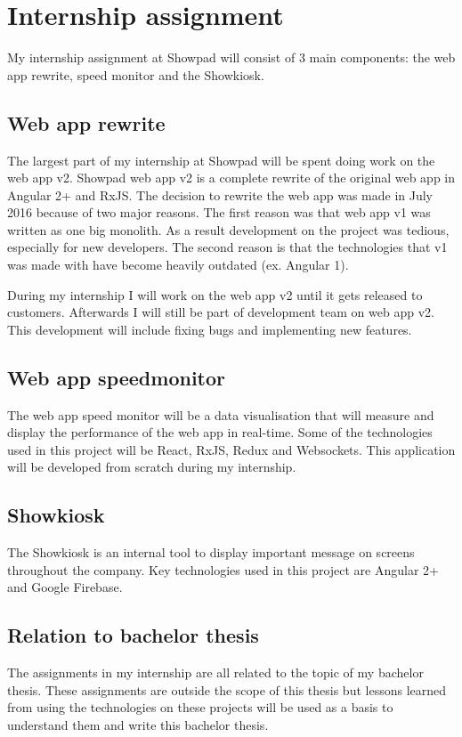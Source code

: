 \chapter{Internship assignment} %
\label{sec:opdracht}

My internship assignment at Showpad will consist of 3 main components: the web app rewrite, speed monitor and the Showkiosk.

\section{Web app rewrite}

The largest part of my internship at Showpad will be spent doing work on the web app v2. Showpad web app v2 is a complete rewrite of the original web app in Angular 2+ and RxJS. The decision to rewrite the web app was made in July 2016 because of two major reasons. The first reason was that web app v1 was written as one big monolith. As a result development on the project was tedious, especially for new developers. The second reason is that the technologies that v1 was made with have become heavily outdated (ex. Angular 1).

During my internship I will work on the web app v2 until it gets released to customers. Afterwards I will still be part of development team on web app v2. This development will include fixing bugs and implementing new features.

\section{Web app speedmonitor}

The web app speed monitor will be a data visualisation that will measure and display the performance of the web app in real-time. Some of the technologies used in this project will be React, RxJS, Redux and Websockets. This application will be developed from scratch during my internship.

\section{Showkiosk}

The Showkiosk is an internal tool to display important message on screens throughout the company. Key technologies used in this project are Angular 2+ and Google Firebase.

\section{Relation to bachelor thesis}

The assignments in my internship are all related to the topic of my bachelor thesis. These assignments are outside the scope of this thesis but lessons learned from using the technologies on these projects will be used as a basis to understand them and write this bachelor thesis.